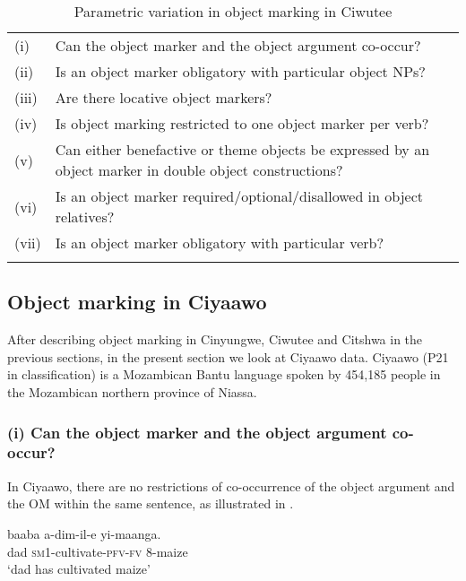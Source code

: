 \documentclass[output=paper]{langscibook}
\begin{document}
\begin{table}
\caption{\label{tab:ngunga:4} Parametric variation in object marking in Ciwutee}
\begin{tabularx}{\textwidth}{lQl}

\lsptoprule

(i) & Can the object marker and the object argument co-occur? & \\
(ii) & Is an object marker obligatory with particular object NPs? & \\
(iii) & Are there locative object markers? & \\
(iv) & Is object marking restricted to one object marker per verb? & \\
(v) & Can either benefactive or theme objects be expressed by an object marker in double object constructions? & \\
(vi) & Is an object marker required\slash optional\slash disallowed in object relatives? & \\
(vii) & Is an object marker obligatory with particular verb? & \\
\lspbottomrule
\end{tabularx}
\end{table}

\subsection{Object marking in Ciyaawo} \label{sec:ngunga:3.4}

After describing object marking in Cinyungwe, Ciwutee and Citshwa in the previous sections, in the present section we look at Ciyaawo data. Ciyaawo (P21 in  classification) is a Mozambican Bantu language spoken by 454,185 people in the Mozambican northern province of Niassa. 

\subsubsection{(i) Can the object marker and the object argument co-occur?}


In Ciyaawo, there are no restrictions of co-occurrence of the object argument and the OM within the same sentence, as illustrated in .

\ea\label{ex:ngunga:49}
\ea\label{ex:ngunga:49a} \gll  baaba    a-dim-il-e    yi-maanga.\\
  dad  {\textsc{sm1}}-cultivate-{\textsc{pfv}-\textsc{fv}}  {8}{}-maize\\
\glt  ‘dad has cultivated maize’    
\end{document}
